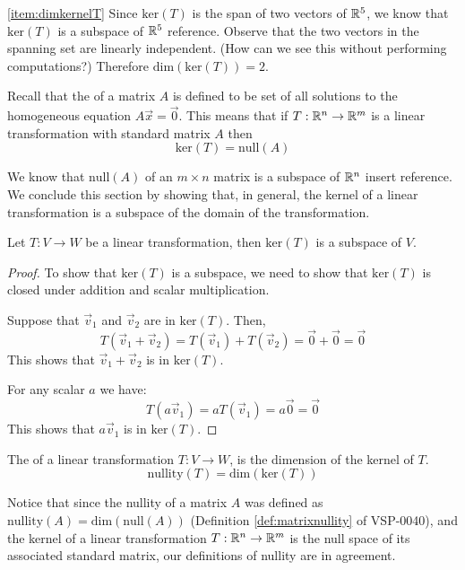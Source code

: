 \documentclass{ximera}
\begin{document}
\begin{example}
\begin{explanation}
\ref{item:dimkernelT}  Since $\mbox{ker}(T)$ is the span of two vectors of $\mathbb{R}^5$, we know that $\mbox{ker}(T)$ is a subspace of $\mathbb{R}^5$ {\color{red} reference}.  Observe that the two vectors in the spanning set are linearly independent. (How can we see this without performing computations?)  Therefore $\mbox{dim}(\mbox{ker}(T))=2$.
\end{explanation}
\end{example}


Recall that the  of a matrix $A$ is defined to be set of all solutions to the homogeneous equation $A\vec{x}=\vec{0}$. This means that  if $T:\mathbb{R}^n\rightarrow \mathbb{R}^m$ is a linear transformation with standard matrix $A$ then
$$\mbox{ker}(T)=\mbox{null}(A)$$

We know that $\mbox{null}(A)$ of an $m\times n$ matrix is a subspace of $\mathbb{R}^n$ {\color{red} insert reference}.  We conclude this section by showing that, in general, the kernel of a linear transformation is a subspace of the domain of the transformation.
\begin{theorem}\label{th:kersubspace} Let $T:V\rightarrow W$ be a linear transformation, then $\mbox{ker}(T)$ is a subspace of $V$.
\end{theorem}
\begin{proof}
To show that $\mbox{ker}(T)$ is a subspace, we need to show that $\mbox{ker}(T)$ is closed under addition and scalar multiplication.

Suppose that $\vec{v}_1$ and $\vec{v}_2$ are in $\mbox{ker}(T)$.  Then,
$$T(\vec{v}_1+\vec{v}_2)=T(\vec{v}_1)+T(\vec{v}_2)=\vec{0}+\vec{0}=\vec{0}$$
This shows that $\vec{v}_1+\vec{v}_2$ is in $\mbox{ker}(T)$.

For any scalar $a$ we have:
$$T(a\vec{v}_1)=aT(\vec{v}_1)=a\vec{0}=\vec{0}$$
This shows that $a\vec{v}_1$ is in $\mbox{ker}(T)$.

\end{proof}



\begin{definition}\label{def:nullityT}
The  of a linear transformation $T:V\rightarrow W$, is the dimension of the kernel of $T$.
$$\mbox{nullity}(T)=\mbox{dim}(\mbox{ker}(T))$$
\end{definition}

Notice that since the nullity of a matrix $A$ was defined as $\mbox{nullity}(A) = \mbox{dim}(\mbox{null}(A))$ (Definition \ref{def:matrixnullity} of VSP-0040), and the kernel of a linear transformation $T:\mathbb{R}^n\rightarrow \mathbb{R}^m$ is the null space of its associated standard matrix, our definitions of nullity are in agreement.
\end{document}
